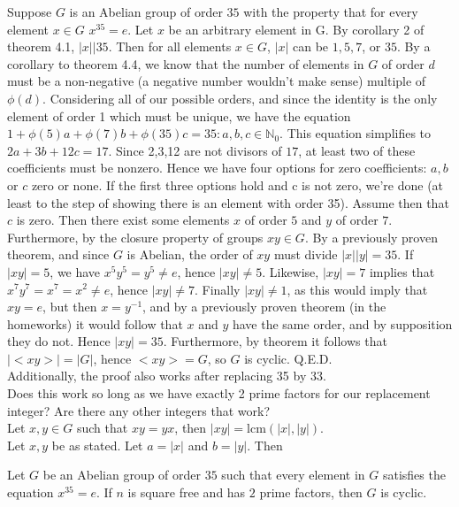 \documentclass{article}
\newcommand{\N}{\mathbb{N}}
\newcommand{\lcm}{\mbox{lcm}}
\begin{document}
 Suppose $G$ is an Abelian group of order $35$ with the property that for every element $x\in G$ $x^{35} = e$. Let $x$ be an arbitrary element in G. By corollary 2 of theorem 4.1, $|x| | 35$. Then for all elements $x\in G$, $|x|$ can be $1,5, 7$, or $35$. By a corollary to theorem 4.4, we know that the number of elements in $G$ of order $d$ must be a non-negative (a negative number wouldn't make sense) multiple of $\phi(d)$. Considering all of our possible orders, and since the identity is the only element of order 1 which must be unique, we have the equation $1+\phi(5)a + \phi(7)b + \phi(35) c = 35: a,b,c\in \N_0.$ This equation simplifies to $2a + 3b + 12 c  = 17$. Since 2,3,12 are not divisors of $17$, at least two of these coefficients must be nonzero. Hence we have four options for zero coefficients: $a,b$ or $c$ zero or none. If the first three options hold and c is not zero, we're done (at least to the step of showing there is an element with order 35). Assume then that $c$ is zero. Then there exist some elements $x$ of order $5$ and $y$ of order $7$. Furthermore, by the closure property of groups $xy\in G$. By a previously proven theorem, and since $G$ is Abelian, the order of $xy$ must divide $|x||y| = 35$. If $|xy| = 5$, we have $x^5 y^5 = y^5 \ne e$, hence $|xy| \ne 5$. Likewise, $|xy| = 7$ implies that $x^7y^7 = x^7 = x^2 \ne e$, hence $|xy| \ne 7$. Finally $|xy| \ne 1$, as this would imply that $xy = e$, but then $x = y^{-1}$, and by a previously proven theorem (in the homeworks) it would follow that $x$ and $y$ have the same order, and by supposition they do not. Hence $|xy| = 35$. Furthermore, by theorem it follows that $|<xy>| = |G|$, hence $<xy> = G$, so $G$ is cyclic. Q.E.D.
\\


 Additionally, the proof also works after replacing 35 by 33. \\

 Does this work so long as we have exactly 2 prime factors for our replacement integer? Are there any other integers that work?\\

 Let $x,y\in G$ such that $xy = yx$, then $|xy| = \lcm(|x|,|y|).$\\
 Let $x,y$ be as stated. Let $a = |x|$ and $b = |y|$. Then 

 Let $G$ be an Abelian group of order $35$ such that every element in $G$ satisfies the equation $x^{35} = e$. If $n$ is square free and has $2$ prime factors, then $G$ is cyclic.\\
\end{document}
